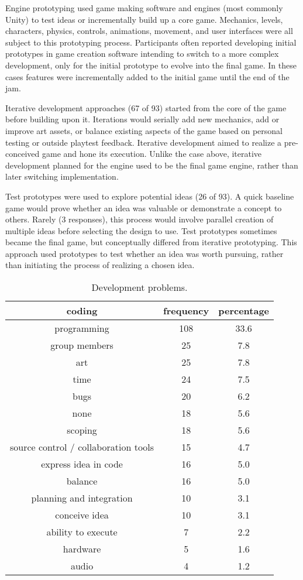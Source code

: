 \documentclass{sig-alternate}
\begin{document}
Engine prototyping used game making software and engines (most commonly Unity) to test ideas or incrementally build up a core game. Mechanics, levels, characters, physics, controls, animations, movement, and user interfaces were all subject to this prototyping process. 
Participants often reported developing initial prototypes in game creation software intending to switch to a more complex development, only for the initial prototype to evolve into the final game. In these cases features were incrementally added to the initial game until the end of the jam.

Iterative development approaches (67 of 93) started from the core of the game before building upon it. Iterations would serially add new mechanics, add or improve art assets, or balance existing aspects of the game based on personal testing or outside playtest feedback.
Iterative development aimed to realize a pre-conceived game and hone its execution.
Unlike the case above, iterative development planned for the engine used to be the final game engine, rather than later switching implementation.

Test prototypes were used to explore potential ideas (26 of 93).
A quick baseline game would prove whether an idea was valuable or demonstrate a concept to others. Rarely (3 responses), this process would involve parallel creation of multiple ideas before selecting the design to use. 
Test prototypes sometimes became the final game, but conceptually differed from iterative prototyping. This approach used prototypes to test whether an idea was worth pursuing, rather than initiating the process of realizing a chosen idea.


\begin{table}[tb]
\centering
\scriptsize
\begin{tabular}{|c|c|c|}
\hline coding & frequency & percentage \\ 
\hline programming & 108 & 33.6 \\ 
\hline group members & 25 & 7.8 \\ 
\hline art & 25 & 7.8 \\ 
\hline time & 24 & 7.5 \\ 
\hline bugs & 20 & 6.2 \\ 
\hline none & 18 & 5.6 \\ 
\hline scoping & 18 & 5.6 \\ 
\hline source control / collaboration tools & 15 & 4.7 \\ 
\hline express idea in code & 16 & 5.0 \\ 
\hline balance & 16 & 5.0 \\ 
\hline planning and integration & 10 & 3.1 \\ 
\hline conceive idea & 10 & 3.1 \\ 
\hline ability to execute & 7 & 2.2 \\ 
\hline hardware & 5 & 1.6 \\ 
\hline audio & 4 & 1.2 \\
\hline 
\end{tabular}
\caption{Development problems.}
\label{tab:problem}
\end{table}
\end{document}
